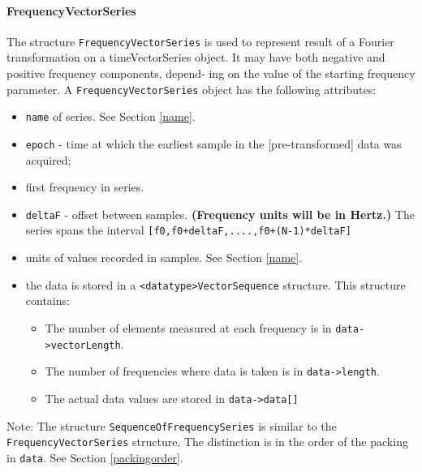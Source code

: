 \documentclass[]{ligodcc}
\renewcommand{\texttt}[1]{{\ttfamily\color{blue}#1}}
\begin{document}
\paragraph{{\texttt {FrequencyVectorSeries}} \\}


The structure {\tt FrequencyVectorSeries} is used to represent result of a
Fourier transformation on a timeVectorSeries object. It may have both
negative and positive frequency components, depend- ing on the value
of the starting frequency parameter. A {\tt FrequencyVectorSeries} object
has the following attributes:


\begin{itemize}
\vspace{-0.15in}
\item
{\tt name} of series. See Section \ref{name}.
\vspace{-0.15in}
\item
{\tt epoch}  -  time at which the earliest sample in the [pre-transformed]
data was acquired;
\vspace{-0.15in}
\item
first frequency in series. 
\vspace{-0.15in}
\item
{\tt deltaF}  -  offset between samples.  {\bf (Frequency units will be in Hertz.)}
The series spans the interval {\tt [f0,f0+deltaF,....,f0+(N-1)*deltaF]}
\vspace{-0.15in}
\item
units of values recorded in samples. See Section \ref{name}.
\vspace{-0.15in}
\item
the data is stored in a {\tt <datatype>VectorSequence}  
structure. This structure contains:
\begin{itemize}
\vspace{-0.10in}
\item
The number of elements measured at each frequency is in {\tt data->vectorLength}.
\vspace{-0.10in}
\item
The number of frequencies where  data is taken is in {\tt data->length}.
\vspace{-0.10in}
\item
The actual data  values are stored in {\tt data->data[]}
\end{itemize}
\end{itemize}

Note: The structure {\tt SequenceOfFrequencySeries} is similar to the
{\tt FrequencyVectorSeries} structure. The distinction is in the order of
the packing in {\tt *data}. See Section \ref{packingorder}.
\end{document}
